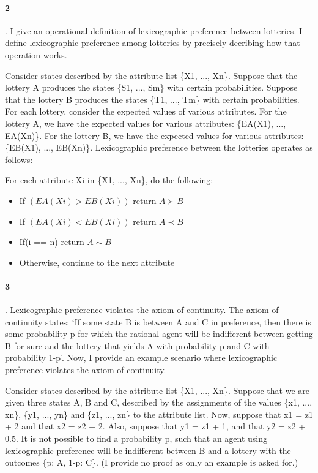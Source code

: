 \documentclass[10pt]{article}
\begin{document}
   \paragraph{2}. I give an operational definition of lexicographic preference between lotteries. I define lexicographic preference among lotteries by precisely decribing how that operation works.

Consider states described by the attribute list \{X1, ..., Xn\}. Suppose that the lottery A produces the states \{S1, ..., Sm\} with certain probabilities. Suppose that the lottery B produces the states \{T1, ..., Tm\} with certain probabilities. For each lottery, consider the expected values of various attributes. For the lottery A, we have the expected values for various attributes: \{EA(X1), ..., EA(Xn)\}. For the lottery B, we have the expected values for various attributes: \{EB(X1), ..., EB(Xn)\}. Lexicographic preference between the lotteries operates as follows:

For each attribute Xi in \{X1, ..., Xn\}, do the following:
\begin{itemize}
 \item If $(EA(Xi) > EB(Xi))$ return $A \succ B$
 \item If $(EA(Xi) < EB(Xi))$ return $A \prec B$
 \item If(i == n) return $A \sim B$
 \item Otherwise, continue to the next attribute
\end{itemize}


   \paragraph{3}. Lexicographic preference violates the axiom of continuity. The axiom of continuity states: `If some state B is between A and C in preference, then there is some probability p for which the rational agent will be indifferent between getting B for sure and the lottery that yields A with probability p and C with probability 1-p'. Now, I provide an example scenario where lexicographic preference violates the axiom of continuity.

Consider states described by the attribute list \{X1, ..., Xn\}. Suppose that we are given three states A, B and C, described by the assignments of the values \{x1, ..., xn\}, \{y1, ..., yn\} and \{z1, ..., zn\} to the attribute list. Now, suppose that x1 = z1 + 2 and that x2 = z2 + 2. Also, suppose that y1 = z1 + 1, and that y2 = z2 + 0.5. It is not possible to find a probability p, such that an agent using lexicographic preference will be indifferent between B and a lottery with the outcomes \{p: A, 1-p: C\}. (I provide no proof as only an example is asked for.)
\end{document}
